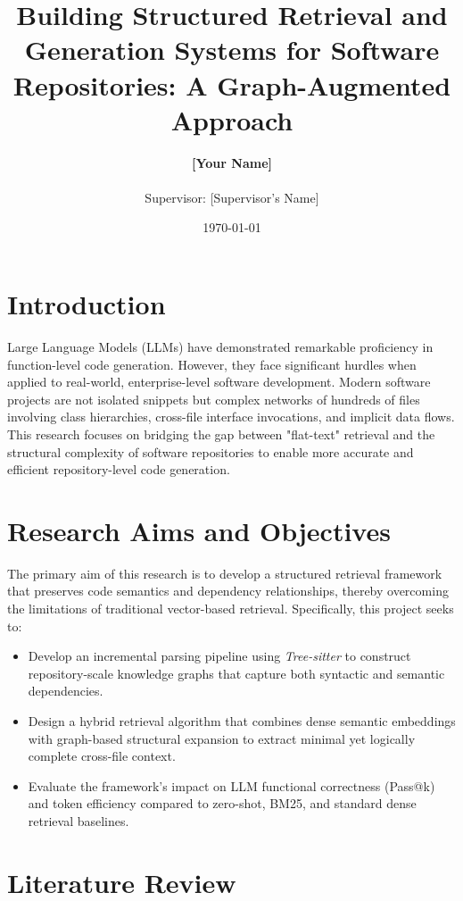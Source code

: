 \documentclass[11pt, a4paper]{article}
\title{\textbf{Building Structured Retrieval and Generation Systems for Software Repositories: A Graph-Augmented Approach}}
\author{\textbf{[Your Name]} \\ [Your Department/University] \\ Supervisor: [Supervisor's Name]}
\date{\today}
\begin{document}
\maketitle
\tableofcontents
\newpage

\section{Introduction}
Large Language Models (LLMs) have demonstrated remarkable proficiency in function-level code generation. However, they face significant hurdles when applied to real-world, enterprise-level software development. Modern software projects are not isolated snippets but complex networks of hundreds of files involving class hierarchies, cross-file interface invocations, and implicit data flows. This research focuses on bridging the gap between "flat-text" retrieval and the structural complexity of software repositories to enable more accurate and efficient repository-level code generation.

\section{Research Aims and Objectives}
The primary aim of this research is to develop a structured retrieval framework that preserves code semantics and dependency relationships, thereby overcoming the limitations of traditional vector-based retrieval. Specifically, this project seeks to:
\begin{itemize}
    \item Develop an incremental parsing pipeline using \textit{Tree-sitter} to construct repository-scale knowledge graphs that capture both syntactic and semantic dependencies.
    \item Design a hybrid retrieval algorithm that combines dense semantic embeddings with graph-based structural expansion to extract minimal yet logically complete cross-file context.
    \item Evaluate the framework's impact on LLM functional correctness (Pass@k) and token efficiency compared to zero-shot, BM25, and standard dense retrieval baselines.
\end{itemize}

\section{Literature Review}
\end{document}
